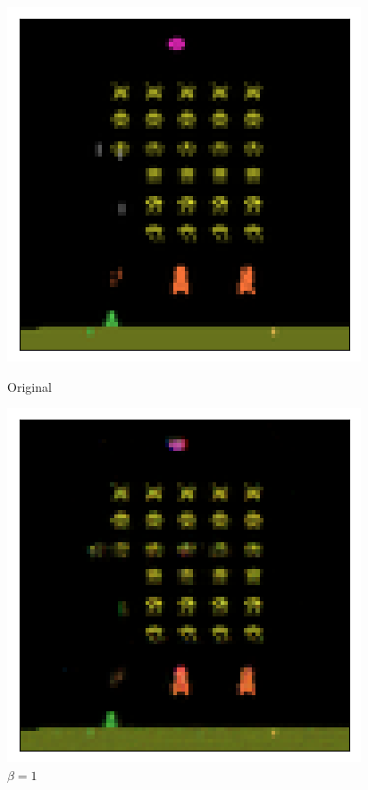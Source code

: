 \begin{figure}[h!]
\centering
\captionsetup{justification=centering}
\begin{multicols}{4}
    \includegraphics[scale=0.4]{figures/results/colour_separated/beta_1_sample_0_original.png}
    \caption{Original}
    \includegraphics[scale=0.4]{figures/results/colour_separated/beta_1_sample_0_reconstructed.png}
    \caption{$\beta = 1$}    

\end{multicols}
\end{figure}
